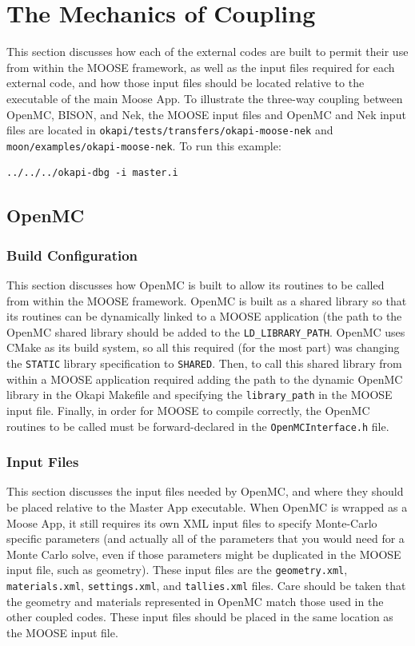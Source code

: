 \documentclass[10pt]{article}
\numberwithin{equation}{section} %
\begin{document}
\clearpage
\section{The Mechanics of Coupling}
This section discusses how each of the external codes are built to permit their use from within the MOOSE framework, as well as the input files required for each external code, and how those input files should be located relative to the executable of the main Moose App. To illustrate the three-way coupling between OpenMC, BISON, and Nek, the MOOSE input files and OpenMC and Nek input files are located in {\tt okapi/tests/transfers/okapi-moose-nek} and {\tt moon/examples/okapi-moose-nek}. To run this example:

\begin{lstlisting}
../../../okapi-dbg -i master.i
\end{lstlisting}

\subsection{OpenMC}

\subsubsection{Build Configuration}
This section discusses how OpenMC is built to allow its routines to be called from within the MOOSE framework. OpenMC is built as a shared library so that its routines can be dynamically linked to a MOOSE application (the path to the OpenMC shared library should be added to the {\tt LD\_LIBRARY\_PATH}. OpenMC uses CMake as its build system, so all this required (for the most part) was changing the {\tt STATIC} library specification to {\tt SHARED}. Then, to call this shared library from within a MOOSE application required adding the path to the dynamic OpenMC library in the Okapi Makefile and specifying the {\tt library\_path} in the MOOSE input file. Finally, in order for MOOSE to compile correctly, the OpenMC routines to be called must be forward-declared in the {\tt OpenMCInterface.h} file.

\subsubsection{Input Files}
This section discusses the input files needed by OpenMC, and where they should be placed relative to the Master App executable. When OpenMC is wrapped as a Moose App, it still requires its own XML input files to specify Monte-Carlo specific parameters (and actually all of the parameters that you would need for a Monte Carlo solve, even if those parameters might be duplicated in the MOOSE input file, such as geometry). These input files are the {\tt geometry.xml}, {\tt materials.xml}, {\tt settings.xml}, and {\tt tallies.xml} files. Care should be taken that the geometry and materials represented in OpenMC match those used in the other coupled codes. These input files should be placed in the same location as the MOOSE input file.
\end{document}
